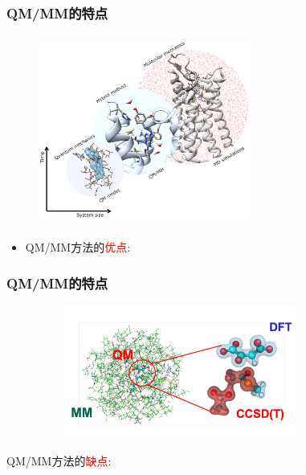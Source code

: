 \frame
{
	\frametitle{\textrm{QM/MM}的特点}
\begin{figure}[h!]
\centering
\vspace{-10.5pt}
\includegraphics[height=2.45in,width=2.75in,viewport=0 0 280 250,clip]{Figures/biomolecules-QM-MM.png}
\label{biomelecules-QM-MM}
\end{figure}
\begin{itemize}
	\item \textrm{QM/MM}方法的\textcolor{red}{优点}:~{\fontsize{8.0pt}{4.2pt}\selectfont{能处理复杂的大分子体系}}\\
		{\fontsize{6.5pt}{4.2pt}}

\end{itemize}
}

\frame
{
	\frametitle{\textrm{QM/MM}的特点}
\begin{figure}[h!]
\centering
\vspace{-5.5pt}
\includegraphics[height=1.73in,width=3.70in,viewport=0 15 320 165,clip]{Figures/MM-QM-CCSD.jpg}
\label{MM-QM-CCSD}
\end{figure}
\textrm{QM/MM}方法的\textcolor{red}{缺点}:~
{\fontsize{8.0pt}{4.2pt}}
}

